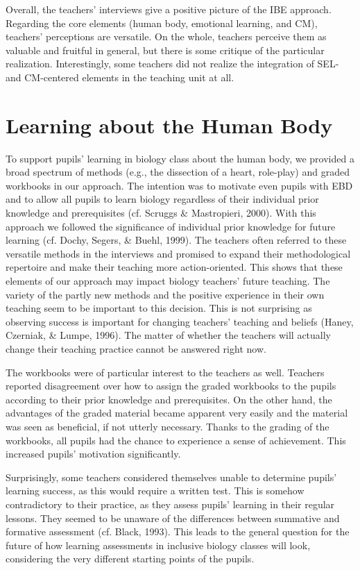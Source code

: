 \documentclass[11.5pt]{sig-alternate} %
\begin{document}
\begin{large}
Overall, the teachers’ interviews give a positive picture of the IBE approach. Regarding the core elements (human body, emotional learning, and CM), teachers’ perceptions are versatile. On the whole, teachers perceive them as valuable and fruitful in general, but there is some critique of the particular realization. Interestingly, some teachers did not realize the integration of SEL- and CM-centered elements in the teaching unit at all.

\section*{Learning about the Human Body}

To support pupils’ learning in biology class about the human body, we provided a broad spectrum of methods (e.g., the dissection of a heart, role-play) and graded workbooks in our approach. The intention was to motivate even pupils with EBD and to allow all pupils to learn biology regardless of their individual prior knowledge and prerequisites (cf. Scruggs \& Mastropieri, 2000). With this approach we followed the significance of individual prior knowledge for future learning (cf. Dochy, Segers, \& Buehl, 1999). The teachers often referred to these versatile methods in the interviews and promised to expand their methodological repertoire and make their teaching more action-oriented. This shows that these elements of our approach may impact biology teachers’ future teaching. The variety of the partly new methods and the positive experience in their own teaching seem to be important to this decision. This is not surprising as observing success is important for changing teachers’ teaching and beliefs (Haney, Czerniak, \& Lumpe, 1996). The matter of whether the teachers will actually change their teaching practice cannot be answered right now.

The workbooks were of particular interest to the teachers as well. Teachers reported disagreement over how to assign the graded workbooks to the pupils according to their prior knowledge and prerequisites. On the other hand, the advantages of the graded material became apparent very easily and the material was seen as beneficial, if not utterly necessary. Thanks to the grading of the workbooks, all pupils had the chance to experience a sense of achievement. This increased pupils’ motivation significantly.

Surprisingly, some teachers considered themselves unable to determine pupils’ learning success, as this would require a written test. This is somehow contradictory to their practice, as they assess pupils’ learning in their regular lessons. They seemed to be unaware of the differences between summative and formative assessment (cf. Black, 1993). This leads to the general question for the future of how learning assessments in inclusive biology classes will look, considering the very different starting points of the pupils.


\end{large}
\end{document}
